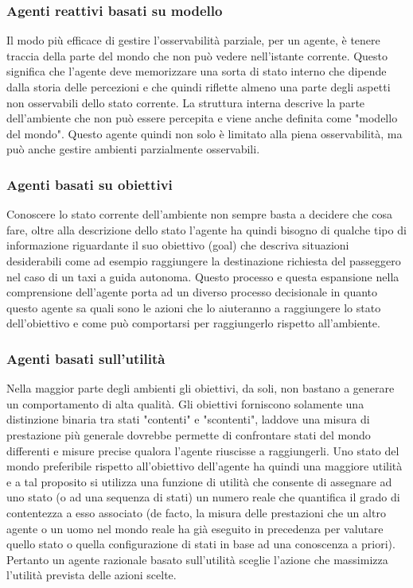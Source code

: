 \subsubsection{Agenti reattivi basati su modello}
Il modo più efficace di gestire l'osservabilità parziale, per un agente, è tenere traccia della parte del mondo che non può vedere nell'istante corrente. Questo significa che l'agente deve memorizzare una sorta di stato interno che dipende dalla storia delle percezioni e che quindi riflette almeno una parte degli aspetti non osservabili dello stato corrente.
La struttura interna descrive la parte dell'ambiente che non può essere percepita e viene anche definita come "modello del mondo". Questo agente quindi non solo è limitato alla piena osservabilità, ma può anche gestire ambienti parzialmente osservabili.

\subsubsection{Agenti basati su obiettivi}
Conoscere lo stato corrente dell'ambiente non sempre basta a decidere che cosa fare, oltre alla descrizione dello stato l'agente ha quindi bisogno di qualche tipo di informazione riguardante il suo obiettivo (goal) che descriva situazioni desiderabili come ad esempio raggiungere la destinazione richiesta del passeggero nel caso di un taxi a guida autonoma.
Questo processo e questa espansione nella comprensione dell'agente porta ad un diverso processo decisionale in quanto questo agente sa quali sono le azioni che lo aiuteranno a raggiungere lo stato dell'obiettivo e come può comportarsi per raggiungerlo rispetto all'ambiente.

\subsubsection{Agenti basati sull'utilità}
Nella maggior parte degli ambienti gli obiettivi, da soli, non bastano a generare un comportamento di alta qualità. Gli obiettivi forniscono solamente una distinzione binaria tra stati "contenti" e "scontenti", laddove una misura di prestazione più generale dovrebbe permette di confrontare stati del mondo differenti e misure precise qualora l'agente riuscisse a raggiungerli. Uno stato del mondo preferibile rispetto all'obiettivo dell'agente ha quindi una maggiore utilità e a tal proposito si utilizza una funzione di utilità che consente di assegnare ad uno stato (o ad una sequenza di stati) un numero reale che quantifica il grado di contentezza a esso associato (de facto, la misura delle prestazioni che un altro agente o un uomo nel mondo reale ha già eseguito in precedenza per valutare quello stato o quella configurazione di stati in base ad una conoscenza a priori).
Pertanto un agente razionale basato sull'utilità sceglie l'azione che massimizza l'utilità prevista delle azioni scelte.

